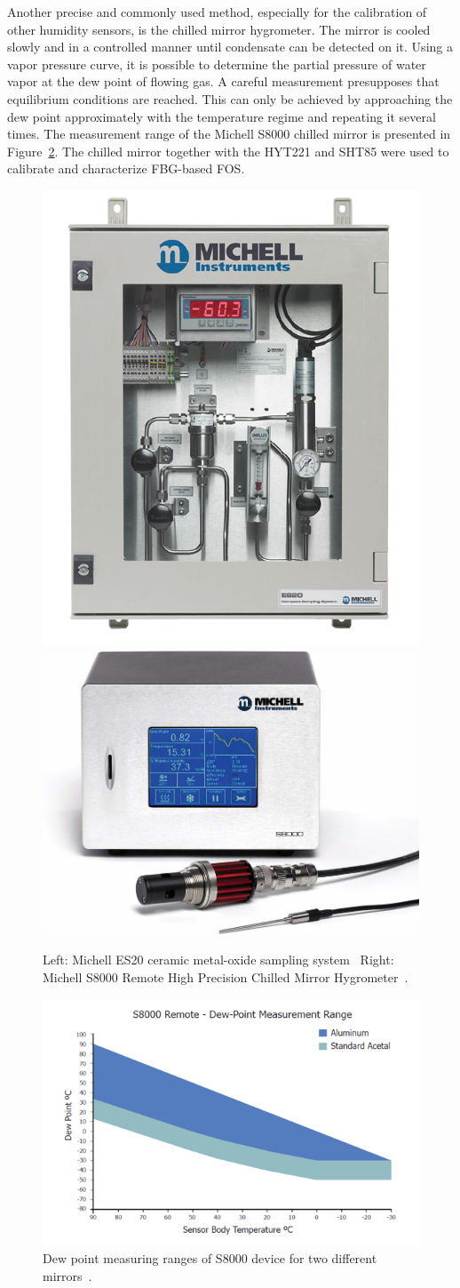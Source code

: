 Another precise and commonly used method, especially for the calibration of other humidity sensors, is the chilled mirror hygrometer. The mirror is cooled slowly and in a controlled manner until condensate can be detected on it. Using a vapor pressure curve, it is possible to determine the partial pressure of water vapor at the dew point of flowing gas. A careful measurement presupposes that equilibrium conditions are reached. This can only be achieved by approaching the dew point approximately with the temperature regime and repeating it several times. The measurement range of the Michell S8000 chilled mirror is presented in Figure~\ref{fig:fos_mirror}. The chilled mirror together with the HYT221 and SHT85 were used to calibrate and characterize FBG-based \gls{FOS}. 



\begin{figure}[!h]
\centering
\includegraphics[width=0.35\columnwidth]{Chapter5/images/ES20.png}
\includegraphics[width=0.4\columnwidth]{Chapter5/images/s8000.png}
\caption{Left: Michell ES20 ceramic metal-oxide sampling system~\cite{michell_e20}
Right: Michell S8000 Remote High Precision Chilled Mirror Hygrometer~\cite{michell_s8000}.}
\label{fig:sniffer}
\end{figure}


\begin{figure}[!h]
\centering
\includegraphics[width=0.65\columnwidth]{Chapter5/images/s8000_remote.png}
\caption{Dew point measuring ranges of S8000 device for two different mirrors~\cite{michell_s8000}.}
\label{fig:fos_mirror}
\end{figure}
\newpage
